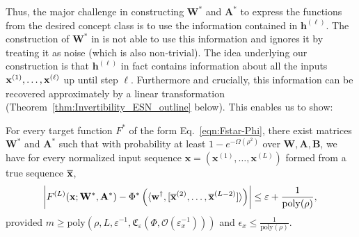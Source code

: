 Thus, the major challenge in constructing $\mathbf{W}^{\ast}$ and $\mathbf{A}^{\ast}$ to express the functions from the desired concept class is to use the information contained in $\mathbf{h}^{(\ell)}$. The construction of $\mathbf{W}^\ast$ in \cite{allen2019can} is not able to use this information and ignores it by treating it as noise (which is also non-trivial). The idea underlying our construction is that $\mathbf{h}^{(\ell)}$ in fact contains information about all the inputs $\mathbf{x}^{(1)}, \ldots, \mathbf{x}^{(\ell)}$ up until step $\ell$. Furthermore and crucially, this information can be recovered approximately by a linear transformation (Theorem~\ref{thm:Invertibility_ESN_outline} below). 
This enables us to show: 
\begin{theorem} \label{thm:existence_pseudo_outline}
	For every target function $F^{\ast}$ of the form Eq.~\eqref{eqn:Fstar-Phi}, there exist matrices $\mathbf{W}^{*}$ and $\mathbf{A}^{\ast}$ such that with probability at least $1-e^{-\Omega\left(\rho^{2}\right)}$ over $\mathbf{W}, \mathbf{A}, \mathbf{B}$, we have for every normalized input sequence $\mathbf{x} = (\mathbf{x}^{(1)}, \ldots, \mathbf{x}^{(L)})$ formed from a true sequence $\overline{\mathbf{x}}$,  
	\begin{align*}
		\abs{F^{(L)}(\mathbf{x}; \mathbf{W}^{\ast}, \mathbf{A}^{\ast}) - \Phi^{\ast} \left(\langle  \mathbf{w}^{\dagger}, [\overline{\mathbf{x}}^{(2)}, \ldots, \overline{\mathbf{x}}^{(L-2)}]\rangle\right)}  \le \varepsilon + \frac{1}{\mathrm{poly}(\rho)},   
	\end{align*}
	provided $m \ge \mathrm{poly}(\rho, L, \varepsilon^{-1}, \mathfrak{C}_{\varepsilon}(\Phi, \mathcal{O}(\varepsilon_x^{-1})))$ and $\epsilon_x \le \frac{1}{\mathrm{poly}(\rho)}$.
\end{theorem}

\begin{prf}
    
\end{prf}

